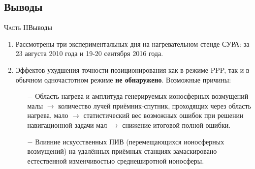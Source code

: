 \subsection{Выводы}
\begin{frame}{\textsc{Часть II}}{Выводы}
\begin{enumerate}
\justifying
\item Рассмотрены три экспериментальных дня на нагревательном стенде СУРА: за 23 августа 2010 года и 19-20 сентября 2016 года.
\item Эффектов ухудшения точности позиционирования как в режиме PPP, так и в обычном одночастотном режиме \textbf{не обнаружено}.
Возможные причины:
\begin{itemize}
\justifying
\item[$-$] Область нагрева и амплитуда генерируемых ионосферных возмущений малы $\rightarrow$ количество лучей приёмник-спутник, проходящих через область нагрева, мало $\rightarrow$ статистический вес возможных ошибок при решении навигационной задачи мал $\rightarrow$ снижение итоговой полной ошибки.  
\item[$-$] Влияние искусственных ПИВ (перемещающихся ионосферных возмущений) на удалённых приёмных станциях замаскировано естественной изменчивостью среднеширотной ионосферы.
\end{itemize}
\end{enumerate}    
\end{frame}